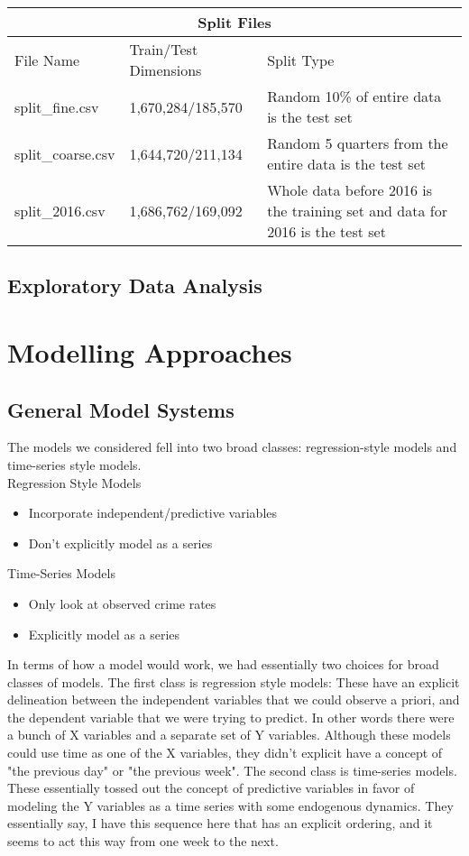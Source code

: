\documentclass[10pt,journal,compsoc]{IEEEtran}
\begin{document}
\begin{tabular}{ |p{2cm}|p{3cm}|p{2cm}|  }
 \hline
 \multicolumn{3}{|c|}{Split Files} \\
 \hline
 File Name& Train/Test Dimensions & Split Type\\
 \hline
 split\_fine.csv& 1,670,284/185,570  & Random 10\% of entire data is the test set\\
 \hline
 split\_coarse.csv& 1,644,720/211,134  & Random 5 quarters from the entire data is the
test set\\
\hline
 split\_2016.csv & 1,686,762/169,092 & Whole data before 2016 is the training set
and data for 2016 is the test set\\
 \hline
\end{tabular}

\subsection{Exploratory Data Analysis}


\section{Modelling Approaches}
\subsection{General Model Systems}
The models we considered fell into two broad classes:
regression-style models and time-series style models.\\

Regression Style Models
\begin{itemize}
  \item Incorporate independent/predictive variables
  \item Don't explicitly model as a series
\end{itemize}

Time-Series Models
\begin{itemize}
\item Only look at observed crime rates
\item Explicitly model as a series
\end{itemize}

In terms of how a model would work, we had essentially two choices for broad classes of models. The first class is regression style models: These have an explicit delineation between the independent variables that we could observe a priori, and the dependent variable that we were trying to predict. In other words there were a bunch of X variables and a separate set of Y variables. Although these models could use time as one of the X variables, they didn't explicit have a concept of "the previous day" or "the previous week". The second class is time-series models. These essentially tossed out the concept of predictive variables in favor of modeling the Y variables as a time series with some endogenous dynamics. They essentially say, I have this sequence here that has an explicit ordering, and it seems to act this way from one week to the next.\\
\end{document}
